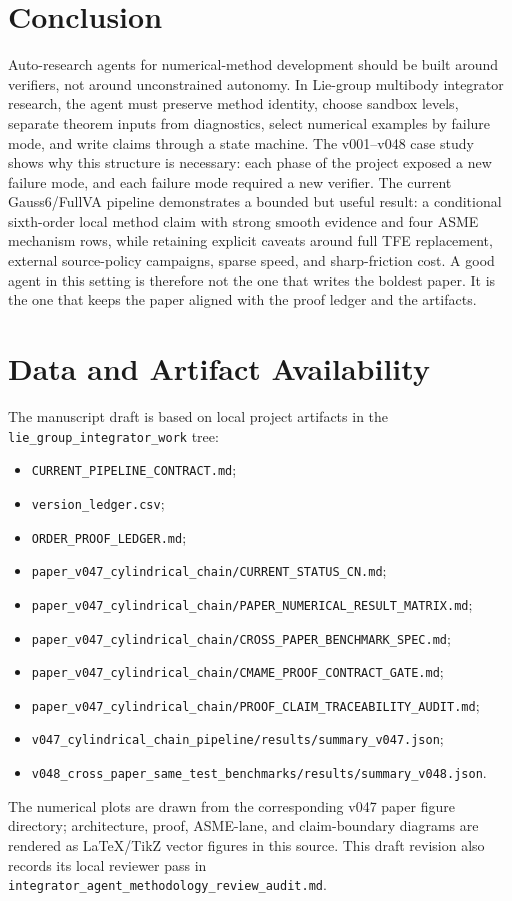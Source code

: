 \documentclass[10pt]{article}
\newcommand{\method}{Gauss6/FullVA}
\begin{document}
\section{Conclusion}

Auto-research agents for numerical-method development should be built around
verifiers, not around unconstrained autonomy. In Lie-group multibody integrator
research, the agent must preserve method identity, choose sandbox levels,
separate theorem inputs from diagnostics, select numerical examples by failure
mode, and write claims through a state machine. The v001--v048 case study shows
why this structure is necessary: each phase of the project exposed a new
failure mode, and each failure mode required a new verifier. The current
\method{} pipeline demonstrates a bounded but useful result: a conditional
sixth-order local method claim with strong smooth evidence and four ASME
mechanism rows, while retaining explicit caveats around full TFE replacement,
external source-policy campaigns, sparse speed, and sharp-friction cost. A
good agent in this setting is therefore not the one that writes the boldest
paper. It is the one that keeps the paper aligned with the proof ledger and the
artifacts.

\section*{Data and Artifact Availability}

The manuscript draft is based on local project artifacts in the
\texttt{lie\_group\_integrator\_work} tree:
\begin{itemize}
  \item \texttt{CURRENT\_PIPELINE\_CONTRACT.md};
  \item \texttt{version\_ledger.csv};
  \item \texttt{ORDER\_PROOF\_LEDGER.md};
  \item \texttt{paper\_v047\_cylindrical\_chain/CURRENT\_STATUS\_CN.md};
  \item \texttt{paper\_v047\_cylindrical\_chain/PAPER\_NUMERICAL\_RESULT\_MATRIX.md};
  \item \texttt{paper\_v047\_cylindrical\_chain/CROSS\_PAPER\_BENCHMARK\_SPEC.md};
  \item \texttt{paper\_v047\_cylindrical\_chain/CMAME\_PROOF\_CONTRACT\_GATE.md};
  \item \texttt{paper\_v047\_cylindrical\_chain/PROOF\_CLAIM\_TRACEABILITY\_AUDIT.md};
  \item \texttt{v047\_cylindrical\_chain\_pipeline/results/summary\_v047.json};
  \item \texttt{v048\_cross\_paper\_same\_test\_benchmarks/results/summary\_v048.json}.
\end{itemize}
The numerical plots are drawn from the corresponding v047 paper figure
directory; architecture, proof, ASME-lane, and claim-boundary diagrams are
rendered as LaTeX/TikZ vector figures in this source. This draft revision also
records its local reviewer pass in
\texttt{integrator\_agent\_methodology\_review\_audit.md}.
\end{document}
